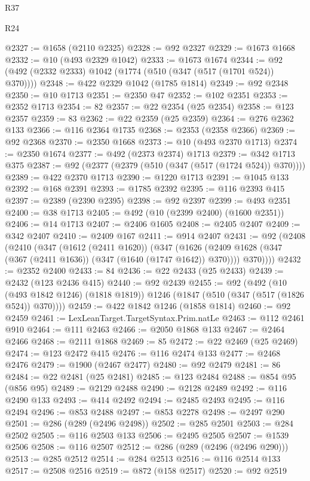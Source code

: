 \begin{lexlean}{R37}
\begin{lexlean}{R24}
\begin{coremodule}
{{{{{{{{{{{{{{{{{{{{{{{{{{{{{{{{{{{{{{{{{{{{{{{{{{{{{{{{{{{{{{{{{{{{{{{{{{{{{{{{{{{{{{{{{{{{{{{{{{{{{{{{{{{{{{{{{{{{{{{{{{{{{{{{{{{{{{{{{{{{{{{{{{{{{{{{{{{{{{{{{{{{{{{{{{{{{{{{{{{{{{{{{@2327 := @1658 (@2110 @2325)
@2328 := @92 @2327
@2329 := @1673 @1668
@2332 := @10 (@493 @2329 @1042)
@2333 := @1673 @1674
@2344 := @92 (@492 (@2332 @2333) @1042 (@1774 (@510 (@347 (@517 (@1701 @524)) @370))))
@2348 := @422 @2329 @1042 (@1785 @1814)
@2349 := @92 @2348
@2350 := @10 @1713
@2351 := @2350 @47
@2352 := @102 @2351
@2353 := @2352 @1713
@2354 := 82
@2357 := @22 @2354 (@25 @2354)
@2358 := @123 @2357
@2359 := 83
@2362 := @22 @2359 (@25 @2359)
@2364 := @276 @2362 @133
@2366 := @116 @2364 @1735
@2368 := @2353 (@2358 @2366)
@2369 := @92 @2368
@2370 := @2350 @1668
@2373 := @10 (@493 @2370 @1713)
@2374 := @2350 @1674
@2377 := @492 (@2373 @2374) @1713
@2379 := @342 @1713 @375
@2387 := @92 (@2377 (@2379 (@510 (@347 (@517 (@1724 @524)) @370))))
@2389 := @422 @2370 @1713
@2390 := @1220 @1713
@2391 := @1045 @133
@2392 := @168 @2391
@2393 := @1785 @2392
@2395 := @116 @2393 @415
@2397 := @2389 (@2390 @2395)
@2398 := @92 @2397
@2399 := @493 @2351
@2400 := @38 @1713
@2405 := @492 (@10 (@2399 @2400) (@1600 @2351))
@2406 := @14 @1713
@2407 := @2406 @1605
@2408 := @2405 @2407
@2409 := @342 @2407
@2410 := @2409 @167
@2411 := @914 @2407
@2431 := @92
    (@2408
      (@2410
        (@347
          (@1612 (@2411 @1620))
          (@347
            (@1626 (@2409 @1628 (@347 (@367 (@2411 @1636)) (@347 (@1640 (@1747 @1642)) @370))))
            @370))))
@2432 := @2352 @2400
@2433 := 84
@2436 := @22 @2433 (@25 @2433)
@2439 := @2432 (@123 @2436 @415)
@2440 := @92 @2439
@2455 := @92
    (@492
      (@10 (@493 @1842 @1246) (@1818 @1819))
      @1246
      (@1847 (@510 (@347 (@517 (@1826 @524)) @370))))
@2459 := @422 @1842 @1246 (@1858 @1814)
@2460 := @92 @2459
@2461 := LexLeanTarget.TargetSyntax.Prim.natLe
@2463 := @112 @2461 @910
@2464 := @111 @2463
@2466 := @2050 @1868 @133
@2467 := @2464 @2466
@2468 := @2111 @1868
@2469 := 85
@2472 := @22 @2469 (@25 @2469)
@2474 := @123 @2472 @415
@2476 := @116 @2474 @133
@2477 := @2468 @2476
@2479 := @1900 (@2467 @2477)
@2480 := @92 @2479
@2481 := 86
@2484 := @22 @2481 (@25 @2481)
@2485 := @123 @2484
@2488 := @854 @95 (@856 @95)
@2489 := @2129 @2488
@2490 := @2128 @2489
@2492 := @116 @2490 @133
@2493 := @414 @2492
@2494 := @2485 @2493
@2495 := @116 @2494
@2496 := @853 @2488
@2497 := @853 @2278
@2498 := @2497 @290
@2501 := @286 (@289 (@2496 @2498))
@2502 := @285 @2501
@2503 := @284 @2502
@2505 := @116 @2503 @133
@2506 := @2495 @2505
@2507 := @1539 @2506
@2508 := @116 @2507
@2512 := @286 (@289 (@2496 (@2496 @290)))
@2513 := @285 @2512
@2514 := @284 @2513
@2516 := @116 @2514 @133
@2517 := @2508 @2516
@2519 := @872 (@158 @2517)
@2520 := @92 @2519
}}}}}}}}}}}}}}}}}}}}}}}}}}}}}}}}}}}}}}}}}}}}}}}}}}}}}}}}}}}}}}}}}}}}}}}}}}}}}}}}}}}}}}}}}}}}}}}}}}}}}}}}}}}}}}}}}}}}}}}}}}}}}}}}}}}}}}}}}}}}}}}}}}}}}}}}}}}}}}}}}}}}}}}}}}}}}}}}}}}}}}}}}
\end{coremodule}
\end{lexlean}
\end{lexlean}
